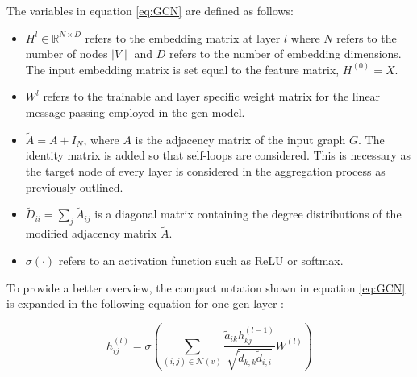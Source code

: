 	\noindent The variables in equation \ref{eq:GCN} are defined as follows:

	\begin{itemize}
		\setlength\itemsep{0.2em}
		\item $H^{l}\in\mathbb{R}^{N \times D}$ refers to the embedding matrix
			at layer $l$ where $N$ refers to the number of nodes $\mid V \mid$
			and $D$ refers to the number of embedding dimensions. The input
			embedding matrix is set equal to the feature matrix, $H^{(0)}=X$.
		\item $W^{l}$ refers to the trainable and layer specific weight matrix
			for the linear message passing employed in the \acs{gcn} model.
		\item $\tilde A = A + I_N$, where $A$ is the adjacency matrix of the
			input graph $G$. The identity matrix is added so that self-loops
			are considered. This is necessary as the target node of every layer
			is considered in the aggregation process as previously outlined.
		\item $\tilde D_{ii} = \sum_{j}\tilde A_{ij}$ is a diagonal matrix
			containing the degree distributions of the modified adjacency
			matrix $\tilde A$.
		\item $\sigma(\cdot)$ refers to an activation function such as ReLU
			\citep{nair2010rectified} or softmax.
	\end{itemize}

	\noindent To provide a better overview, the compact notation shown in 
	equation \ref{eq:GCN} is expanded in the following equation for one
	\acs{gcn} layer \citep{Dubois2019}:

	\begin{equation}
		h_{ij}^{(l)} = \sigma\left(\sum_{(i,j)\in
		\mathcal{N}(v)}\frac{\tilde a_{ik}h_{kj}^{(l-1)}}{\sqrt{\tilde
d_{k,k}\tilde d_{i,i}}} W^{(l)}\right)
		\label{eq:GCN_expand}
	\end{equation}
	
